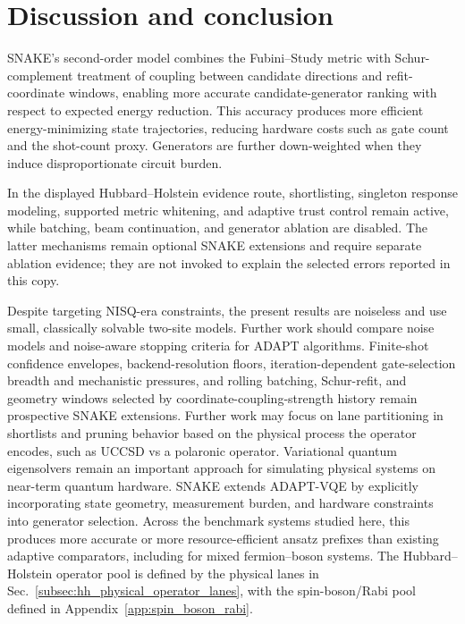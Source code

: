\documentclass[
  reprint,
  amsmath,
  amssymb,
  aps,
  pra,
  nofootinbib,
  superscriptaddress,
  floatfix
]{revtex4-2}
\begin{document}
\par\addvspace{1.0ex}

\section{Discussion and conclusion}
\label{sec:discussion}
\label{sec:conclusion}

SNAKE's second-order model combines the Fubini--Study metric with Schur-complement treatment of coupling between candidate directions and refit-coordinate windows, enabling more accurate candidate-generator ranking with respect to expected energy reduction. This accuracy produces more efficient energy-minimizing state trajectories, reducing hardware costs such as gate count and the shot-count proxy. Generators are further down-weighted when they induce disproportionate circuit burden.

In the displayed Hubbard--Holstein evidence route, shortlisting, singleton response modeling, supported metric whitening, and adaptive trust control remain active, while batching, beam continuation, and generator ablation are disabled. The latter mechanisms remain optional SNAKE extensions and require separate ablation evidence; they are not invoked to explain the selected errors reported in this copy.

Despite targeting NISQ-era constraints, the present results are noiseless and use small, classically solvable two-site models. Further work should compare noise models and noise-aware stopping criteria for ADAPT algorithms. Finite-shot confidence envelopes, backend-resolution floors, iteration-dependent gate-selection breadth and mechanistic pressures, and rolling batching, Schur-refit, and geometry windows selected by coordinate-coupling-strength history remain prospective SNAKE extensions. Further work may focus on lane partitioning in shortlists and pruning behavior based on the physical process the operator encodes, such as UCCSD vs a polaronic operator.
Variational quantum eigensolvers remain an important approach for simulating physical systems on near-term quantum hardware. SNAKE extends ADAPT-VQE by explicitly incorporating state geometry, measurement burden, and hardware constraints into generator selection. Across the benchmark systems studied here, this produces more accurate or more resource-efficient ansatz prefixes than existing adaptive comparators, including for mixed fermion--boson systems. The Hubbard--Holstein operator pool is defined by the physical lanes in Sec.~\ref{subsec:hh_physical_operator_lanes}, with the spin-boson/Rabi pool defined in Appendix~\ref{app:spin_boson_rabi}.
\end{document}
